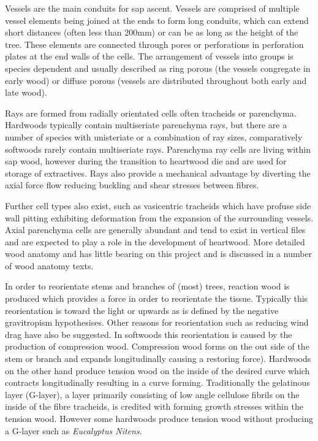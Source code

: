 \documentclass{article}
\begin{document}
Vessels are the main conduits for sap ascent. Vessels are comprised of multiple
vessel elements being joined at the ends to form long conduits, which can extend short
distances (often less than 200mm) or can be as long as the height of the tree.
These elements are connected through pores or perforations in perforation
plates at the end walls of the cells. The arrangement of vessels into groups is
species dependent and usually described as ring porous (the vessels congregate in early wood)
or diffuse porous (vessels are distributed throughout both early and late wood).

Rays are formed from radially orientated cells often tracheids or parenchyma.
Hardwoods typically contain multiseriate parenchyma rays, but there are a
number of species with unisteriate or a combination of ray sizes, comparatively
softwoods rarely contain multiseriate rays. Parenchyma ray cells are living within sap wood,
however during the transition to heartwood die and are used for storage of
extractives. Rays also provide a mechanical advantage by diverting the
axial force flow reducing buckling and shear stresses between fibres.

Further cell types also exist, such as vasicentric tracheids which have profuse
side wall pitting exhibiting deformation from the expansion of the surrounding
vessels. Axial parenchyma cells are generally abundant and tend to exist in
vertical files and are expected to play a role in the development of heartwood.
More detailed wood anatomy and has little bearing on this project and is
discussed in a number of wood anatomy texts.

In order to reorientate stems and branches of (most) trees, reaction wood is
produced which provides a force in order to reorientate the tissue. Typically this
reorientation is toward the light or upwards as is defined by the negative
gravitropism hypothesises. Other reasons for reorientation such as reducing wind
drag have also be suggested. In softwoods this reorientation is caused by the
production of compression wood. Compression wood forms on the out side of the
stem or branch and expands longitudinally causing a
restoring force). Hardwoods on the other hand produce tension wood on the inside
of the desired curve which contracts longitudinally resulting in a curve forming.
Traditionally the gelatinous layer (G-layer), a layer primarily consisting of
low angle cellulose fibrils on the inside of the fibre tracheids, is credited with forming growth
stresses within the tension wood. However some hardwoods produce tension wood
without producing a G-layer such as \textit{Eucalyptus Nitens}.
\end{document}
